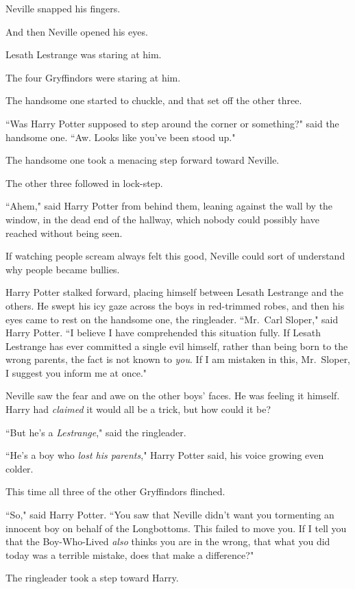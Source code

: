 Neville snapped his fingers.

And then Neville opened his eyes.

Lesath Lestrange was staring at him.

The four Gryffindors were staring at him.

The handsome one started to chuckle, and that set off the other three.

``Was Harry Potter supposed to step around the corner or something?" said the handsome one. ``Aw. Looks like you've been stood up."

The handsome one took a menacing step forward toward Neville.

The other three followed in lock-step.

``Ahem," said Harry Potter from behind them, leaning against the wall by the window, in the dead end of the hallway, which nobody could possibly have reached without being seen.

If watching people scream always felt this good, Neville could sort of understand why people became bullies.

Harry Potter stalked forward, placing himself between Lesath Lestrange and the others. He swept his icy gaze across the boys in red-trimmed robes, and then his eyes came to rest on the handsome one, the ringleader. ``Mr.~Carl Sloper," said Harry Potter. ``I believe I have comprehended this situation fully. If Lesath Lestrange has ever committed a single evil himself, rather than being born to the wrong parents, the fact is not known to \emph{you}. If I am mistaken in this, Mr.~Sloper, I suggest you inform me at once."

Neville saw the fear and awe on the other boys' faces. He was feeling it himself. Harry had \emph{claimed} it would all be a trick, but how could it be?

``But he's a \emph{Lestrange}," said the ringleader.

``He's a boy who \emph{lost his parents}," Harry Potter said, his voice growing even colder.

This time all three of the other Gryffindors flinched.

``So," said Harry Potter. ``You saw that Neville didn't want you tormenting an innocent boy on behalf of the Longbottoms. This failed to move you. If I tell you that the Boy-Who-Lived \emph{also} thinks you are in the wrong, that what you did today was a terrible mistake, does that make a difference?"

The ringleader took a step toward Harry.

